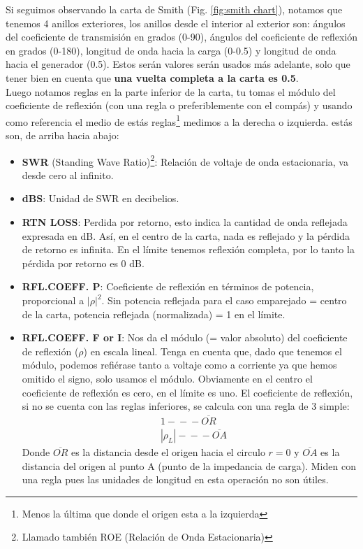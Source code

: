 \documentclass[
	12pt, %
	fleqn, %
	a4paper, %
	oneside, %
]{LegrandOrangeBook}
\begin{document}
Si seguimos observando la carta de Smith (Fig. \ref{fig:smith chart}), notamos que tenemos 4 anillos exteriores, los anillos desde el interior al exterior son: ángulos del coeficiente de transmisión en grados (0-90), ángulos del coeficiente de reflexión en grados (0-180), longitud de onda hacia la carga (0-0.5) y longitud de onda hacia el generador (0.5). Estos serán valores serán usados más adelante, solo que tener bien en cuenta que \textbf{una vuelta completa a la carta es 0.5}.\\
Luego notamos reglas en la parte inferior de la carta, tu tomas el módulo del coeficiente de reflexión (con una regla o preferiblemente con el compás) y usando como referencia el medio de estás reglas\footnote{Menos la última que donde el origen esta a la izquierda} medimos a la derecha o izquierda. estás son, de arriba hacia abajo:
\begin{itemize}
\item \textbf{SWR} (Standing Wave Ratio)\footnote{Llamado también ROE (Relación de Onda Estacionaria)}: Relación de voltaje de onda estacionaria, va desde cero al infinito.
\item \textbf{dBS}: Unidad de SWR en decibelios.
\item \textbf{RTN LOSS}: Perdida por retorno, esto indica
la cantidad de onda reflejada expresada en dB. Así, en el centro de la carta, nada es reflejado y la pérdida de retorno es infinita. En el límite tenemos reflexión completa, por lo tanto la pérdida por retorno es 0 dB.
\item \textbf{RFL.COEFF. P}: Coeficiente de reflexión en términos de potencia, proporcional a $|\rho|^2$. Sin potencia reflejada para el caso emparejado = centro de la carta, potencia reflejada (normalizada) = 1 en el límite.
\item \textbf{RFL.COEFF. F or I}: Nos da el módulo (= valor absoluto) del coeficiente de reflexión ($\rho$) en escala lineal. Tenga en cuenta que, dado que tenemos el módulo, podemos refiérase tanto a voltaje como a corriente ya que hemos omitido el signo, solo usamos el módulo. Obviamente en el centro el coeficiente de reflexión es cero, en el límite es uno. El coeficiente de reflexión, si no se cuenta con las reglas inferiores, se calcula con una regla de 3 simple:
\begin{align*}
& 1 -\!\!\!-\!\!\!- \overline{OR}\\
& |\rho_L| -\!\!\!-\!\!\!- \overline{OA}
\end{align*}
Donde $\overline{OR}$ es la distancia desde el origen hacia el circulo $r=0$ y $\overline{OA}$ es la distancia del origen al punto A (punto de la impedancia de carga). Miden con una regla pues las unidades de longitud en esta operación no son útiles.

\end{itemize}
\end{document}
